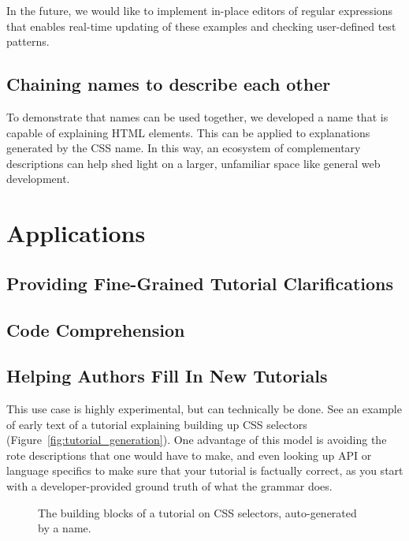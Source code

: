 In the future, we would like to implement in-place editors of regular expressions that enables real-time updating of these examples and checking user-defined test patterns.

\subsection{Chaining \glspl{name} to describe each other}

To demonstrate that \glspl{name} can be used together, we developed a \gls{name} that is capable of explaining HTML elements.
This can be applied to explanations generated by the CSS \gls{name}.
In this way, an ecosystem of complementary descriptions can help shed light on a larger, unfamiliar space like general web development.

\section{Applications}

\subsection{Providing Fine-Grained Tutorial Clarifications}

\subsection{Code Comprehension}

\subsection{Helping Authors Fill In New Tutorials}

This use case is highly experimental, but can technically be done.
See an example of early text of a tutorial explaining building up CSS selectors (Figure~\ref{fig:tutorial_generation}).
One advantage of this model is avoiding the rote descriptions that one would have to make, and even looking up API or language specifics to make sure that your tutorial is factually correct, as you start with a developer-provided ground truth of what the grammar does.

\begin{figure}
\caption{The building blocks of a tutorial on CSS selectors, auto-generated by a \gls{name}.}
\end{figure}


